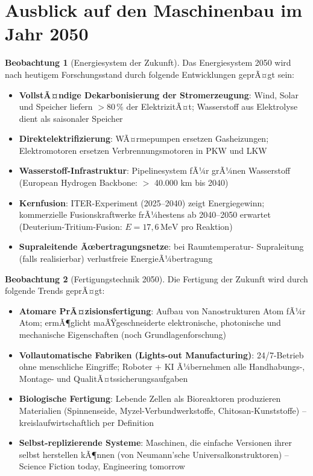 ﻿\documentclass[a4paper,12pt]{report}
\theoremstyle{definition}
\newtheorem{beobachtung}{Beobachtung}
\begin{document}
\section{Ausblick auf den Maschinenbau im Jahr 2050}

\begin{beobachtung}[Energiesystem der Zukunft]
Das Energiesystem 2050 wird nach heutigem Forschungsstand durch
folgende Entwicklungen geprÃ¤gt sein:
\begin{itemize}
    \item[-] \textbf{VollstÃ¤ndige Dekarbonisierung der Stromerzeugung}:
          Wind, Solar und Speicher liefern $> 80\,\%$ der ElektrizitÃ¤t;
          Wasserstoff aus Elektrolyse dient als saisonaler Speicher
    \item[-] \textbf{Direktelektrifizierung}: WÃ¤rmepumpen ersetzen Gasheizungen;
          Elektromotoren ersetzen Verbrennungsmotoren in PKW und LKW
    \item[-] \textbf{Wasserstoff-Infrastruktur}: Pipelinesystem fÃ¼r grÃ¼nen
          Wasserstoff (European Hydrogen Backbone: $>$ 40.000 km bis 2040)
    \item[-] \textbf{Kernfusion}: ITER-Experiment (2025--2040) zeigt Energiegewinn;
          kommerzielle Fusionskraftwerke frÃ¼hestens ab 2040--2050 erwartet
          (Deuterium-Tritium-Fusion: $E = 17{,}6\,\mathrm{MeV}$ pro Reaktion)
    \item[-] \textbf{Supraleitende Ãœbertragungsnetze}: bei Raumtemperatur-
          Supraleitung (falls realisierbar) verlustfreie EnergieÃ¼bertragung
\end{itemize}
\end{beobachtung}

\begin{beobachtung}[Fertigungstechnik 2050]
Die Fertigung der Zukunft wird durch folgende Trends geprÃ¤gt:
\begin{itemize}
    \item[-] \textbf{Atomare PrÃ¤zisionsfertigung}: Aufbau von Nanostrukturen
          Atom fÃ¼r Atom; ermÃ¶glicht maÃŸgeschneiderte elektronische, photonische
          und mechanische Eigenschaften (noch Grundlagenforschung)
    \item[-] \textbf{Vollautomatische Fabriken (Lights-out Manufacturing)}:
          24/7-Betrieb ohne menschliche Eingriffe; Roboter + KI Ã¼bernehmen
          alle Handhabungs-, Montage- und QualitÃ¤tssicherungsaufgaben
    \item[-] \textbf{Biologische Fertigung}: Lebende Zellen als Bioreaktoren
          produzieren Materialien (Spinnenseide, Myzel-Verbundwerkstoffe,
          Chitosan-Kunststoffe) -- kreislaufwirtschaftlich per Definition
    \item[-] \textbf{Selbst-replizierende Systeme}: Maschinen, die einfache
          Versionen ihrer selbst herstellen kÃ¶nnen (von Neumann'sche
          Universalkonstruktoren) -- Science Fiction today, Engineering tomorrow
\end{itemize}
\end{beobachtung}
\end{document}
